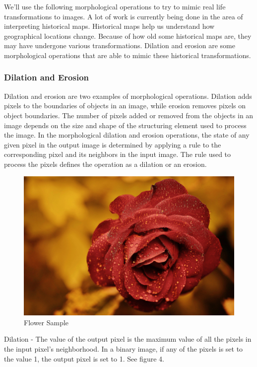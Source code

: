 \documentclass{article}
\begin{document}
We'll use the following morphological operations to try to mimic real life
transformations to images. A lot of work is currently being done in the area of
interpreting historical maps. Historical maps help us understand how
geographical locations change. Because of how old some historical maps are,
they may have undergone various transformations. Dilation and erosion are some
morphological operations that are able to mimic these historical
transformations.

\subsubsection{Dilation and Erosion}

Dilation and erosion are two examples of morphological operations. Dilation
adds pixels to the boundaries of objects in an image, while erosion removes
pixels on object boundaries. The number of pixels added or removed from the
objects in an image depends on the size and shape of the structuring element
used to process the image. In the morphological dilation and erosion
operations, the state of any given pixel in the output image is determined by
applying a rule to the corresponding pixel and its neighbors in the input
image. The rule used to process the pixels defines the operation as a dilation
or an erosion. \cite{dilation}

\begin{figure}[h]
\centering
\includegraphics[scale=0.05]{cv_flower.jpg}
\caption{Flower Sample}
\end{figure}

Dilation - The value of the output pixel is the maximum value of all the pixels
in the input pixel's neighborhood. In a binary image, if any of the pixels is
set to the value 1, the output pixel is set to 1. See figure 4.
\end{document}
